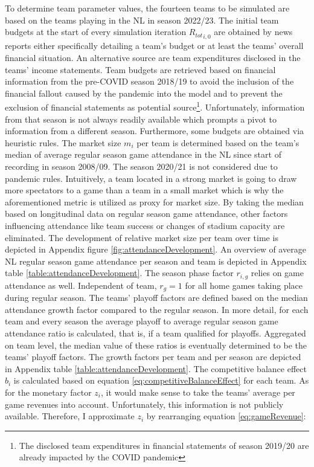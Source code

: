 \documentclass[12pt, a4paper]{article}
\begin{document}
To determine team parameter values, the fourteen teams to be simulated are based on the teams playing in the NL in season 2022/23. The initial team budgets at the start of every simulation iteration ${R_{tot}}_{i,0}$ are obtained by news reports either specifically detailing a team's budget or at least the teams' overall financial situation. An alternative source are team expenditures disclosed in the teams' income statements. Team budgets are retrieved based on financial information from the pre-COVID season 2018/19 to avoid the inclusion of the financial fallout caused by the pandemic into the model and to prevent the exclusion of financial statements as potential source\footnote{The disclosed team expenditures in financial statements of season 2019/20 are already impacted by the COVID pandemic}. Unfortunately, information from that season is not always readily available which prompts a pivot to information from a different season. Furthermore, some budgets are obtained via heuristic rules. The market size $m_i$ per team is determined based on the team's median of average regular season game attendance in the NL since start of recording in season 2008/09. The season 2020/21 is not considered due to pandemic rules. Intuitively, a team located in a strong market is going to draw more spectators to a game than a team in a small market which is why the aforementioned metric is utilized as proxy for market size. By taking the median based on longitudinal data on regular season game attendance, other factors influencing attendance like team success or changes of stadium capacity are eliminated. The development of relative market size per team over time is depicted in Appendix figure \ref{fig:attendanceDevelopment}. An overview of average NL regular season game attendance per season and team is depicted in Appendix table \ref{table:attendanceDevelopment}. The season phase factor $r_{i,g}$ relies on game attendance as well. Independent of team, $r_{g}=1$ for all home games taking place during regular season. The teams' playoff factors are defined based on the median attendance growth factor compared to the regular season. In more detail, for each team and every season the average playoff to average regular season game attendance ratio is calculated, that is, if a team qualified for playoffs. Aggregated on team level, the median value of these ratios is eventually determined to be the teams' playoff factors. The growth factors per team and per season are depicted in Appendix table \ref{table:attendanceDevelopment}. The competitive balance effect $b_i$ is calculated based on equation \ref{eq:competitiveBalanceEffect} for each team. As for the monetary factor $z_i$, it would make sense to take the teams' average per game revenues into account. Unfortunately, this information is not publicly available. Therefore, I approximate $z_i$ by rearranging equation \ref{eq:gameRevenue}:
\end{document}
